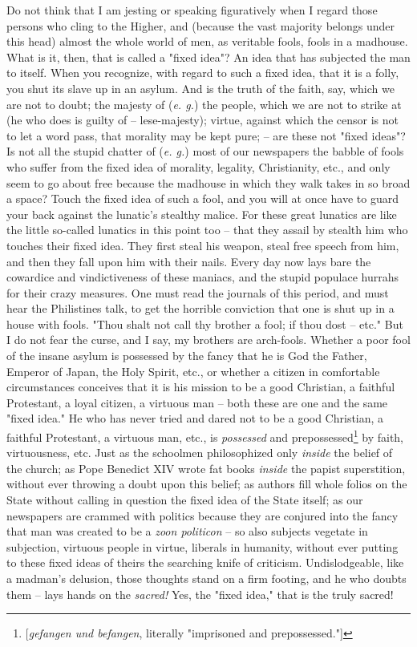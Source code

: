 Do not think that I am jesting or speaking figuratively when I regard those 
persons who cling to the Higher, and (because the vast majority belongs under 
this head) almost the whole world of men, as veritable fools, fools in a 
madhouse. What is it, then, that is called a "{}fixed idea"{}? An idea that 
has subjected the man to itself. When you recognize, with regard to such a 
fixed idea, that it is a folly, you shut its slave up in an asylum. And is the 
truth of the faith, say, which we are not to doubt; the majesty of (\textit{e. 
g.}) the people, which we are not to strike at (he who does is guilty of -- 
lese-majesty); virtue, against which the censor is not to let a word pass, 
that morality may be kept pure; -- are these not "{}fixed ideas"{}? Is not all 
the stupid chatter of (\textit{e. g.}) most of our newspapers the babble of 
fools who suffer from the fixed idea of morality, legality, Christianity, 
etc., and only seem to go about free because the madhouse in which they walk 
takes in so broad a space? Touch the fixed idea of such a fool, and you will 
at once have to guard your back against the lunatic's stealthy malice. For 
these great lunatics are like the little so-called lunatics in this point too 
-- that they assail by stealth him who touches their fixed idea. They first 
steal his weapon, steal free speech from him, and then they fall upon him with 
their nails. Every day now lays bare the cowardice and vindictiveness of these 
maniacs, and the stupid populace hurrahs for their crazy measures. One must 
read the journals of this period, and must hear the Philistines talk, to get 
the horrible conviction that one is shut up in a house with fools. "{}Thou 
shalt not call thy brother a fool; if thou dost -- etc."{} But I do not fear 
the curse, and I say, my brothers are arch-fools. Whether a poor fool of the 
insane asylum is possessed by the fancy that he is God the Father, Emperor of 
Japan, the Holy Spirit, etc., or whether a citizen in comfortable 
circumstances conceives that it is his mission to be a good Christian, a 
faithful Protestant, a loyal citizen, a virtuous man -- both these are one and 
the same "{}fixed idea."{} He who has never tried and dared not to be a good 
Christian, a faithful Protestant, a virtuous man, etc., is \textit{possessed} 
and prepossessed\footnote{[\textit{gefangen und befangen}, literally 
"{}imprisoned and prepossessed."{}]} by faith, virtuousness, etc. Just as the 
schoolmen philosophized only \textit{inside} the belief of the church; as Pope 
Benedict XIV wrote fat books \textit{inside} the papist superstition, without 
ever throwing a doubt upon this belief; as authors fill whole folios on the 
State without calling in question the fixed idea of the State itself; as our 
newspapers are crammed with politics because they are conjured into the fancy 
that man was created to be a \textit{zoon politicon} -- so also subjects 
vegetate in subjection, virtuous people in virtue, liberals in humanity, 
without ever putting to these fixed ideas of theirs the searching knife of 
criticism. Undislodgeable, like a madman's delusion, those thoughts stand on a 
firm footing, and he who doubts them -- lays hands on the \textit{sacred!} 
Yes, the "{}fixed idea,"{} that is the truly sacred!

